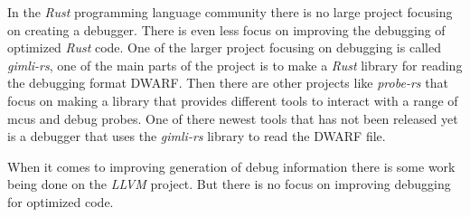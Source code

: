 

In the \emph{Rust} programming language community there is no large project focusing on creating a debugger.
There is even less focus on improving the debugging of optimized \emph{Rust} code.
One of the larger project focusing on debugging is called \emph{gimli-rs}, one of the main parts of the project is to make a \emph{Rust} library for reading the debugging format \gls{DWARF}.
Then there are other projects like \emph{probe-rs} that focus on making a library that provides different tools to interact with a range of \glspl{mcu} and debug probes.
One of there newest tools that has not been released yet is a debugger that uses the \emph{gimli-rs} library to read the \gls{DWARF} file.


When it comes to improving generation of debug information there is some work being done on the \emph{LLVM} project.
But there is no focus on improving debugging for optimized code.

